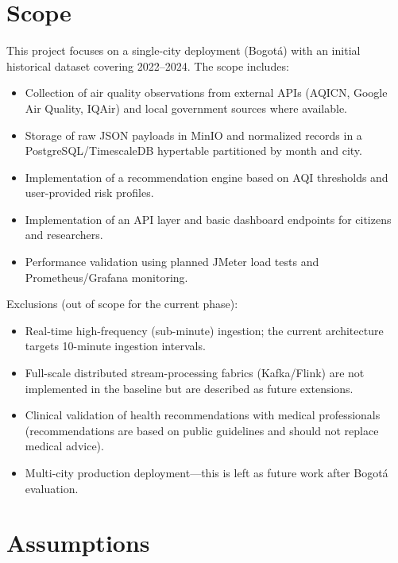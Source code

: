 \section{Scope}
\label{sec:method_scope}

This project focuses on a single-city deployment (Bogotá) with an initial historical dataset covering 2022--2024. The scope includes:
\begin{itemize}
    \item Collection of air quality observations from external APIs (AQICN, Google Air Quality, IQAir) and local government sources where available.
    \item Storage of raw JSON payloads in MinIO and normalized records in a PostgreSQL/TimescaleDB hypertable partitioned by month and city.
    \item Implementation of a recommendation engine based on AQI thresholds and user-provided risk profiles.
    \item Implementation of an API layer and basic dashboard endpoints for citizens and researchers.
    \item Performance validation using planned JMeter load tests and Prometheus/Grafana monitoring.
\end{itemize}

Exclusions (out of scope for the current phase):
\begin{itemize}
    \item Real-time high-frequency (sub-minute) ingestion; the current architecture targets 10-minute ingestion intervals.
    \item Full-scale distributed stream-processing fabrics (Kafka/Flink) are not implemented in the baseline but are described as future extensions.
    \item Clinical validation of health recommendations with medical professionals (recommendations are based on public guidelines and should not replace medical advice).
    \item Multi-city production deployment—this is left as future work after Bogotá evaluation.
\end{itemize}

\section{Assumptions}
\label{sec:method_assumptions}

